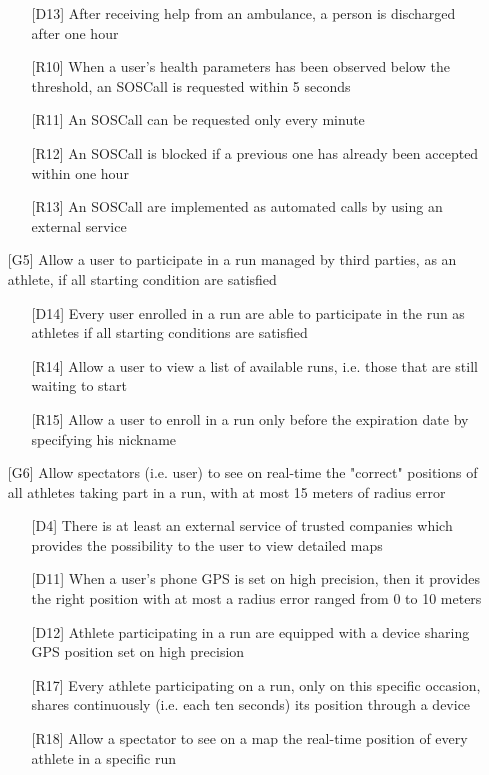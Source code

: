 \begin{itemize}
\begin{itemize}
	\item[{[D13]}] After receiving help from an ambulance, a person is discharged after one hour
	\item[{[R10]}] When a user's health parameters has been observed below the threshold, an SOSCall is requested within 5 seconds
	\item[{[R11]}] An SOSCall can be requested only every minute
	\item[{[R12]}] An SOSCall is blocked if a previous one has already been accepted within one hour
	\item[{[R13]}] An SOSCall are implemented as automated calls by using an external service
	\end{itemize}
\item[{[G5]}] Allow a user to participate in a run managed by third parties, as an athlete, if all starting condition are satisfied
	\begin{itemize}
	\item[{[D14]}] Every user enrolled in a run are able to participate in the run as athletes if all starting conditions are satisfied
	\item[{[R14]}] Allow a user to view a list of available runs, i.e. those that are still waiting to start 
	\item[{[R15]}] Allow a user to enroll in a run only before the expiration date by specifying his nickname
	\end{itemize}
\item[{[G6]}] Allow spectators (i.e. user) to see on real-time the "correct" positions of all athletes taking part in a run, with at most 15 meters of radius error
	\begin{itemize}
	\item[{[D4]}] There is at least an external service of trusted companies which provides the possibility to the user to view detailed maps
	\item[{[D11]}] When a user's phone GPS is set on high precision, then it provides the right position with at most a radius error ranged from 0 to 10 meters
	\item[{[D12]}] Athlete participating in a run are equipped with a device sharing GPS position set on high precision
	\item[{[R17]}] Every athlete participating on a run, only on this specific occasion, shares continuously (i.e. each ten seconds) its position through a device
	\item[{[R18]}] Allow a spectator to see on a map the real-time position of every athlete in a specific run

\end{itemize}
\end{itemize}
